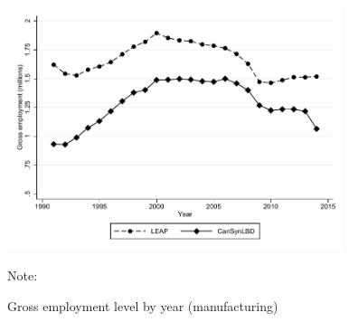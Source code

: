\begin{figure} [H]
\centering
\caption{Gross employment level by year (manufacturing)} \label{GrossEmploymentManufacturing}
\includegraphics[height=2.8in, width=.7\linewidth]{graphs/Gross_employment_level_by_year_manufacturing_bw.pdf} 
\begin{minipage}{0.85\textwidth}
{\footnotesize Note: \TableNote  \par}
\end{minipage}
\end{figure}


